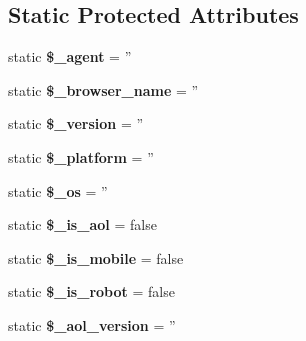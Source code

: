 \subsection*{Static Protected Attributes}
\begin{DoxyCompactItemize}
\item 
\hypertarget{class_browser_a7e43e09863a494197e0cdbf3f98c2ff5}{
static {\bfseries \$\_\-agent} = ''}
\label{class_browser_a7e43e09863a494197e0cdbf3f98c2ff5}

\item 
\hypertarget{class_browser_afbec7931474dbc66925c4524b52dd292}{
static {\bfseries \$\_\-browser\_\-name} = ''}
\label{class_browser_afbec7931474dbc66925c4524b52dd292}

\item 
\hypertarget{class_browser_a01caaf3772469caf98e39064bf5d7d8f}{
static {\bfseries \$\_\-version} = ''}
\label{class_browser_a01caaf3772469caf98e39064bf5d7d8f}

\item 
\hypertarget{class_browser_a991522cf981c79f4faf96b16a91f8a3c}{
static {\bfseries \$\_\-platform} = ''}
\label{class_browser_a991522cf981c79f4faf96b16a91f8a3c}

\item 
\hypertarget{class_browser_a42a707f85d026a3adfc74138d395edaf}{
static {\bfseries \$\_\-os} = ''}
\label{class_browser_a42a707f85d026a3adfc74138d395edaf}

\item 
\hypertarget{class_browser_a9b99e5a49974cb890778475fc4072c4f}{
static {\bfseries \$\_\-is\_\-aol} = false}
\label{class_browser_a9b99e5a49974cb890778475fc4072c4f}

\item 
\hypertarget{class_browser_ab59d2fc84c305620ecc2c2865e3c2875}{
static {\bfseries \$\_\-is\_\-mobile} = false}
\label{class_browser_ab59d2fc84c305620ecc2c2865e3c2875}

\item 
\hypertarget{class_browser_acd836fe0cca820289ba28e5761c91027}{
static {\bfseries \$\_\-is\_\-robot} = false}
\label{class_browser_acd836fe0cca820289ba28e5761c91027}

\item 
\hypertarget{class_browser_a9e4e4861a721ca0fac5aff1fcaa89b5d}{
static {\bfseries \$\_\-aol\_\-version} = ''}
\label{class_browser_a9e4e4861a721ca0fac5aff1fcaa89b5d}

\end{DoxyCompactItemize}


